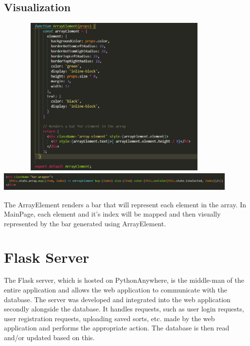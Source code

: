 \subsection{Visualization}
\begin{center}
    \includegraphics[height=8cm,width=12cm]{images/arrayelement}
    \includegraphics[height=1cm,width=12cm]{images/maparray}
\end{center}
The ArrayElement renders a bar that will represent each element in the array. In MainPage, each element and it's index will be mapped and then visually represented by the bar generated using ArrayElement.

\newpage
\section{Flask Server}
The Flask server, which is hosted on PythonAnywhere, is the middle-man of the entire application and allows the web application to communicate with the database. The server was developed and integrated into the web application secondly alongside the database. It handles requests, such as user login requests, user registration requests, uploading saved sorts, etc. made by the web application and performs the appropriate action. The database is then read and/or updated based on this. 

